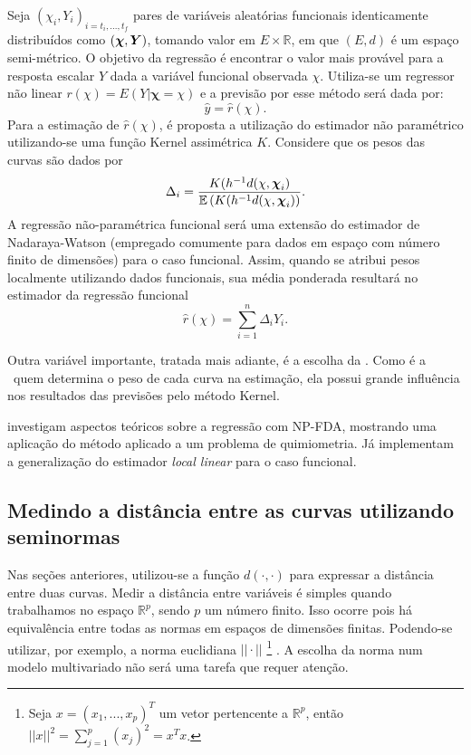 \documentclass[
	12pt,				%
	openright,			%
	oneside,			%
	a4paper,			%
	english,			%
	brazil				%
	]{dissertacao-ufrgs-abntex2}
\begin{document}
Seja $(\chi_i,Y_i)_{i=t_i,...,t_f}$ pares de variáveis aleatórias funcionais identicamente distribuídos como $(\boldsymbol{\chi},\boldsymbol{Y})$, tomando valor em $E \times \mathbb{R}$, em que $(E,d)$ é um espaço semi-métrico. O objetivo da regressão é encontrar o valor mais provável para a resposta escalar $Y$ dada a variável funcional observada $\chi$.
Utiliza-se um regressor não linear $r(\chi)=E(Y|\boldsymbol{\chi}=\chi)$
e a previsão por esse método será dada por:
\[
\hat{y}=\hat{r}(\chi).
\]
Para a estimação de $\hat{r}(\chi)$, é proposta a utilização do estimador
não paramétrico utilizando-se uma função Kernel assimétrica $K$. Considere que os pesos das curvas são dados por
\begin{equation} \label{peso-local}
\Delta_i=\frac{K(h^{-1}d(\chi,\boldsymbol{\chi}_{i})}{\mathbb{E} \left( K(h^{-1}d(\chi,\boldsymbol{\chi}_{i}) \right)}.
\end{equation}
A regressão não-paramétrica funcional será uma extensão do estimador de Nadaraya-Watson (empregado comumente para dados em espaço com número finito de dimensões) para o caso funcional. 
Assim, quando se atribui pesos localmente utilizando dados funcionais, sua média ponderada resultará no estimador da regressão funcional
\begin{equation} \label{eq:regressao-npfda}
	\hat{r}(\chi) = \sum_{i=1}^n \Delta_i Y_i.
\end{equation}

Outra variável importante, tratada mais adiante, é a escolha da \bw. Como é a \bw~quem determina o peso de cada curva na estimação, ela possui grande influência nos resultados das previsões pelo método Kernel.

 investigam aspectos teóricos sobre a regressão com NP-FDA, mostrando uma aplicação do método aplicado a um problema de quimiometria. Já  implementam a generalização do estimador \emph{local linear} para o caso funcional.



\subsection{Medindo a distância entre as curvas utilizando seminormas} \label{sub:semimetricas}

Nas seções anteriores, utilizou-se a função $d(\cdot,\cdot)$ para expressar
a distância entre duas curvas. Medir a distância entre variáveis é
simples quando trabalhamos no espaço $\mathbb{R}^{p}$, sendo $p$
um número finito. Isso ocorre pois há equivalência entre todas as
normas em espaços de dimensões finitas. Podendo-se utilizar, por exemplo,
a norma euclidiana $||\cdot||$%
\footnote{Seja $x=(x_{1},...,x_{p})^{T}$ um vetor pertencente a $\mathbb{R}^{p}$,
então$||x||^{2}=\sum_{j=1}^{p}(x_{j})^{2}=x^{T}x$.%
} . A escolha da norma num modelo multivariado não será uma tarefa
que requer atenção.
\end{document}
